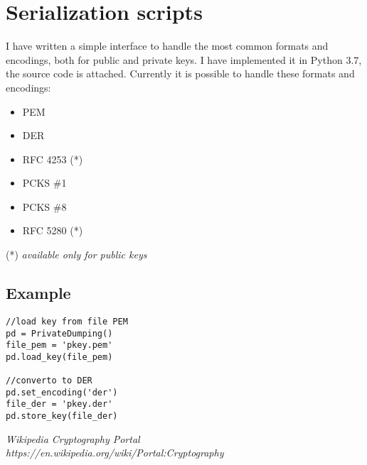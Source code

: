 \documentclass[11 pt]{article}
\begin{document}
\section{Serialization scripts}
I have written a simple interface to handle the most common formats and encodings, both for public and private keys. I have implemented it in Python 3.7, the source code is attached. Currently it is possible to handle these formats and encodings:
\begin{itemize}
	\item PEM
	\item DER
	\item RFC 4253 (*)
	\item PCKS \#1
	\item PCKS \#8
	\item RFC 5280 (*)
\end{itemize}
(*) \textit{available only for public keys}

\subsection{Example}
\begin{verbatim}
//load key from file PEM
pd = PrivateDumping()
file_pem = 'pkey.pem'
pd.load_key(file_pem)

//converto to DER
pd.set_encoding('der')
file_der = 'pkey.der'
pd.store_key(file_der)
\end{verbatim}

\begin{thebibliography}{10}
		
	\textsl{Wikipedia Cryptography Portal} \\
	\textit{https://en.wikipedia.org/wiki/Portal:Cryptography}
	
\end{thebibliography}
\end{document}
